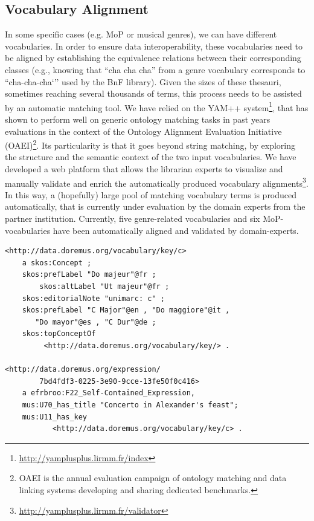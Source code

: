\subsection{Vocabulary Alignment}
In some specific cases (e.g. MoP or musical genres), we can have different vocabularies. In order to ensure data interoperability, these vocabularies need to be aligned by establishing the equivalence relations between their corresponding classes (e.g., knowing that ``cha cha cha'' from a genre vocabulary corresponds to ``cha-cha-cha`'' used by the BnF library). Given the sizes of these thesauri, sometimes reaching several thousands of terms, this process needs to be assisted by an automatic matching tool. We have relied on the YAM++ system\footnote{\url{http://yamplusplus.lirmm.fr/index}}, that has shown to perform well on generic ontology matching tasks in past years  evaluations in the context of the Ontology Alignment Evaluation Initiative (OAEI)\footnote{OAEI is the annual evaluation campaign of ontology matching and data linking systems developing and sharing dedicated benchmarks.}. Its particularity is that it goes beyond string matching, by exploring the structure and the semantic context of the two input vocabularies. We have developed a web platform that allows the librarian experts to visualize and manually validate and enrich the automatically produced vocabulary alignments\footnote{\url{http://yamplusplus.lirmm.fr/validator}}. In this way, a (hopefully) large pool of matching vocabulary terms is produced automatically, that is currently under evaluation by the domain experts from the partner institution. Currently, five genre-related vocabularies and six MoP-vocabularies have been automatically aligned and validated by domain-experts.

\begin{lstlisting}[captionpos=b, caption=Definition and usage of a vocabulary concept, label=lst:skos, basicstyle=\footnotesize\ttfamily,frame=single]
<http://data.doremus.org/vocabulary/key/c>
    a skos:Concept ;
	skos:prefLabel "Do majeur"@fr ;
        skos:altLabel "Ut majeur"@fr ;
	skos:editorialNote "unimarc: c" ;
	skos:prefLabel "C Major"@en , "Do maggiore"@it ,
	   "Do mayor"@es , "C Dur"@de ;
	skos:topConceptOf
	     <http://data.doremus.org/vocabulary/key/> .
	   
<http://data.doremus.org/expression/
        7bd4fdf3-0225-3e90-9cce-13fe50f0c416> 
    a efrbroo:F22_Self-Contained_Expression,
    mus:U70_has_title "Concerto in Alexander's feast";
    mus:U11_has_key
           <http://data.doremus.org/vocabulary/key/c> .
\end{lstlisting}

